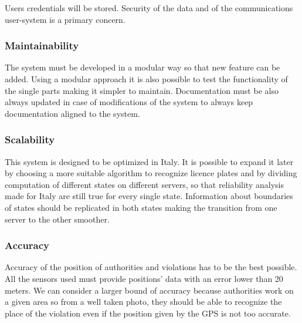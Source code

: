 Users credentials will be stored. Security of the data and of the communications user-system is a primary concern.

\subsubsection {Maintainability}
The system must be developed in a modular way so that new feature can be added.
Using a modular approach it is also possible to test the functionality of the single parts making it simpler to maintain.
Documentation must be also always updated in case of modifications of the system to always keep documentation aligned to the system.
\subsubsection{Scalability}
This system is designed to be optimized in Italy. It is possible to expand it later by choosing a more suitable
algorithm to recognize licence plates and by dividing computation of different states on different servers, so that reliability analysis made for Italy are still true for every single state. Information about boundaries
of states should be replicated in both states making the transition from one server to the other smoother.
\subsubsection{Accuracy}
Accuracy of the position of authorities and violations has to be the best possible. All the sensors used must provide positions' data with an error lower than 20 meters. We can consider a larger bound of accuracy because authorities work on a given area so from a well taken photo, they should be able to recognize the place of the violation even if the position given by the GPS is not too accurate.










